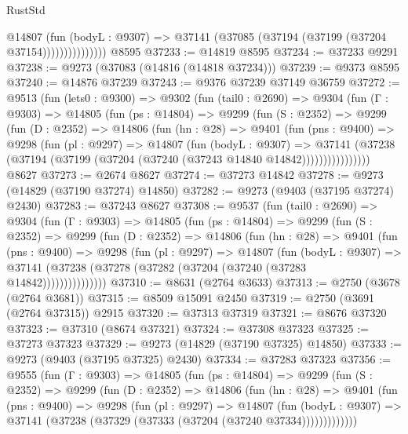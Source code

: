 \begin{lexlean}{RustStd}
\begin{coremodule}
                      @14807
                        (fun (bodyL : @9307) =>
                        @37141 (@37085 (@37194 (@37199 (@37204 @37154)))))))))))))))
    @8595
@37233 := @14819 @8595
@37234 := @37233 @9291
@37238 := @9273 (@37083 (@14816 (@14818 @37234)))
@37239 := @9373 @8595
@37240 := @14876 @37239
@37243 := @9376 @37239 @37149 @36759
@37272 := @9513
    (fun (lets0 : @9300) =>
    @9302
      (fun (tail0 : @2690) =>
      @9304
        (fun (Γ : @9303) =>
        @14805
          (fun (ps : @14804) =>
          @9299
            (fun (S : @2352) =>
            @9299
              (fun (D : @2352) =>
              @14806
                (fun (hn : @28) =>
                @9401
                  (fun (pns : @9400) =>
                  @9298
                    (fun (pl : @9297) =>
                    @14807
                      (fun (bodyL : @9307) =>
                      @37141
                        (@37238
                          (@37194 (@37199 (@37204 (@37240 (@37243 @14840 @14842))))))))))))))))
    @8627
@37273 := @2674 @8627
@37274 := @37273 @14842
@37278 := @9273 (@14829 (@37190 @37274) @14850)
@37282 := @9273 (@9403 (@37195 @37274) @2430)
@37283 := @37243 @8627
@37308 := @9537
    (fun (tail0 : @2690) =>
    @9304
      (fun (Γ : @9303) =>
      @14805
        (fun (ps : @14804) =>
        @9299
          (fun (S : @2352) =>
          @9299
            (fun (D : @2352) =>
            @14806
              (fun (hn : @28) =>
              @9401
                (fun (pns : @9400) =>
                @9298
                  (fun (pl : @9297) =>
                  @14807
                    (fun (bodyL : @9307) =>
                    @37141 (@37238 (@37278 (@37282 (@37204 (@37240 (@37283 @14842)))))))))))))))
@37310 := @8631 (@2764 @3633)
@37313 := @2750 (@3678 (@2764 @3681))
@37315 := @8509 @15091 @2450
@37319 := @2750 (@3691 (@2764 @37315)) @2915
@37320 := @37313 @37319
@37321 := @8676 @37320
@37323 := @37310 (@8674 @37321)
@37324 := @37308 @37323
@37325 := @37273 @37323
@37329 := @9273 (@14829 (@37190 @37325) @14850)
@37333 := @9273 (@9403 (@37195 @37325) @2430)
@37334 := @37283 @37323
@37356 := @9555
    (fun (Γ : @9303) =>
    @14805
      (fun (ps : @14804) =>
      @9299
        (fun (S : @2352) =>
        @9299
          (fun (D : @2352) =>
          @14806
            (fun (hn : @28) =>
            @9401
              (fun (pns : @9400) =>
              @9298
                (fun (pl : @9297) =>
                @14807
                  (fun (bodyL : @9307) =>
                  @37141 (@37238 (@37329 (@37333 (@37204 (@37240 @37334)))))))))))))

\end{coremodule}
\end{lexlean}
